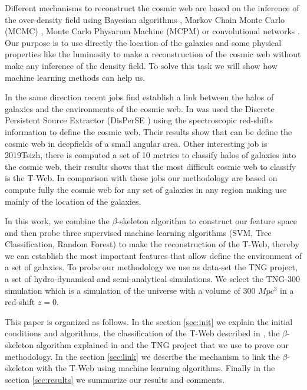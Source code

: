 \documentclass[usenatbib]{mnras}
\begin{document}
Different mechanisms to reconstruct the cosmic web are based on the inference of the over-density field using Bayesian algorithms \cite{2015LeclercqJasche,2018Simola}, Markov Chain Monte Carlo (MCMC) \cite{2016Wang}, Monte Carlo Physarum Machine (MCPM) \cite{2020Burchett} or convolutional networks \cite{2019Zhang}. Our purpose is to use directly the location of the galaxies and some physical properties like the luminosity to make a reconstruction of the cosmic web without make any inference of the density field. To solve this task we will show how machine learning methods can help us.

In the same direction recent jobs find establish a link between the halos of galaxies and the environments of the cosmic web. In \cite{2019Luber} was used the Discrete Persistent Source Extractor (DisPerSE \cite{2010Sousbie})  using the spectroscopic red-shifts information to define the cosmic web. Their results show that can be define the cosmic web in deepfields of a small angular area. Other interesting job is 2019Tsizh, there is computed a set of 10 metrics to classify halos of galaxies into the cosmic web, their results shows that the most difficult cosmic web to classify is the T-Web. In comparison with these jobs our methodology are based on compute fully the cosmic web for any set of galaxies in any region making use mainly of the location of the galaxies.

In this work, we combine the $\beta$-skeleton algorithm to construct our feature space and then probe three supervised machine learning algorithms (SVM, Tree Classification, Random Forest) to make the reconstruction of the T-Web, thereby we can establish the most important features that allow define the environment of a set of galaxies. To probe our methodology we use as data-set the TNG project, a set of hydro-dynamical and semi-analytical simulations. We select  the TNG-300 simulation which is a simulation of the universe with a volume of 300 $Mpc^3$ in a red-shift $z=0$.

This paper is organized as follows. In the section \ref{sec:init} we explain the initial conditions and algorithms, the classification of the T-Web described in \cite{2009Forero-Romero}, the $\beta$-skeleton algorithm  explained in \cite{1985Kirkpatrick} and the TNG project that we use to prove our methodology. In the section \ref{sec:link} we describe the mechanism to link the $\beta$-skeleton with the T-Web using machine learning algorithms. Finally in the section \ref{sec:results} we summarize our results and comments.
\end{document}
